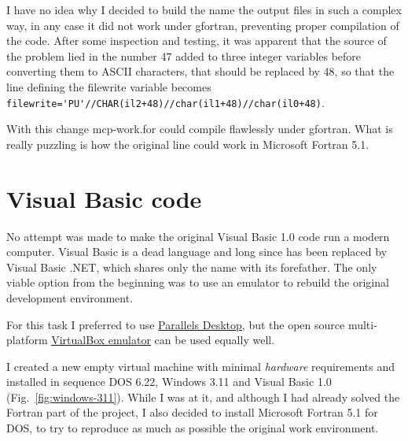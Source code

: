 I have no idea why I decided to build the name the output files in such a complex way, in any case it did not work under gfortran, preventing proper compilation of the code. 
After some inspection and testing, it was apparent that the source of the problem lied in the number \textsf{47} added to three integer variables before converting them to \textsf{ASCII} characters, that should be replaced by \textsf{48}, so that the line defining the \textsf{filewrite} variable becomes \lstinline[columns=fixed]{filewrite='PU'//CHAR(il2+48)//char(il1+48)//char(il0+48)}.


With this change \textsf{mcp-work.for} could compile flawlessly under gfortran.
What is really puzzling is how the original line could work in Microsoft Fortran 5.1.



\section{Visual Basic code}
\label{visual-basic-code}

No attempt was made to make the original Visual Basic 1.0 code run a modern computer. Visual Basic is a dead language and long since has been replaced by Visual Basic .NET, which shares only the name with its forefather. The only viable option from the beginning was to use an emulator to rebuild the original development environment.

For this task I preferred to use \href{https://www.parallels.com/}{Parallels Desktop}, but the open source multi-platform \href{https://www.virtualbox.org/}{VirtualBox emulator} can be used equally well.

I created a new empty virtual machine with minimal \emph{hardware} requirements and installed in sequence DOS 6.22, Windows 3.11 and Visual Basic 1.0 (Fig.~\ref{fig:windows-311}).
While I was at it, and although I had already solved the Fortran part of the project, I also decided to install Microsoft Fortran 5.1 for DOS, to try to reproduce as much as possible the original work environment.


